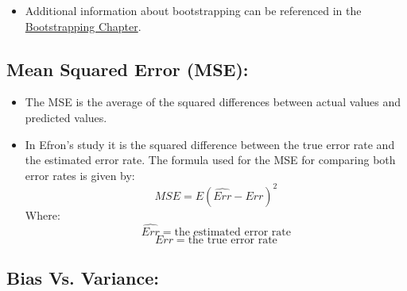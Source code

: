 \documentclass[
  letterpaper,
  DIV=11,
  numbers=noendperiod]{scrreprt}
\providecommand{\tightlist}{%
  \setlength{\itemsep}{0pt}\setlength{\parskip}{0pt}}
\begin{document}
\begin{itemize}
\tightlist
\item
  Additional information about bootstrapping can be referenced in the
  \href{boostrapping.qmd}{Bootstrapping Chapter}.
\end{itemize}

\subsection{Mean Squared Error (MSE):}\label{mean-squared-error-mse}

\begin{itemize}
\tightlist
\item
  The MSE is the average of the squared differences between actual
  values and predicted values.
\item
  In Efron's study it is the squared difference between the true error
  rate and the estimated error rate. The formula used for the MSE for
  comparing both error rates is given by: \[
  MSE = E(\widehat{Err} - Err)^2
  \] Where: \[
  \widehat{Err} = \text{the estimated error rate}
  \] \[
  Err = \text{the true error rate}
  \]
\end{itemize}

\subsection{Bias Vs. Variance:}\label{bias-vs.-variance}
\end{document}
